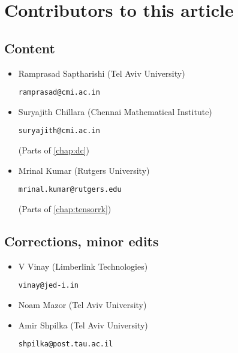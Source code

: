 \chapter*{Contributors to this article}

\section*{Content}

\begin{itemize}
\item Ramprasad Saptharishi (Tel Aviv University)

\texttt{ramprasad@cmi.ac.in}

\item Suryajith Chillara (Chennai Mathematical Institute)

\texttt{suryajith@cmi.ac.in}

(Parts of \autoref{chap:dc})


\item Mrinal Kumar (Rutgers University)

\texttt{mrinal.kumar@rutgers.edu}

(Parts of \autoref{chap:tensorrk})

\end{itemize}

\section*{Corrections, minor edits}

\begin{itemize}
\item V Vinay (Limberlink Technologies)

\texttt{vinay@jed-i.in}

\item Noam Mazor (Tel Aviv University)

\item Amir Shpilka (Tel Aviv University)

\texttt{shpilka@post.tau.ac.il}


\end{itemize}


